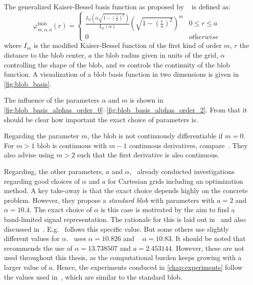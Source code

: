 \begin{definition}\label{def:blob_basis_fn}
	The generalized Kaiser-Bessel basis function as proposed by
	\citeauthor{lewitt_multidimensional_1990}~\cite{lewitt_multidimensional_1990,
		lewitt_alternatives_1992} is defined as:
	\[
		\varphi^{\text{blob}}_{m, \alpha, a}(r) =
		\begin{cases}
			\frac{I_m\left( \alpha \sqrt{1 - \left(\frac{r}{a}\right)^2} \right)} {I_m\left( \alpha \right)} \left( \sqrt{1 - \left(\frac{r}{a}\right)^2}\right)^m & 0 \le r \le a      \\
			0                                                                                                                                                      & \textit{otherwise}
		\end{cases}
	\]
	where \(I_m\) is the modified Kaiser-Bessel function of the first kind of order \(m\), \(r\) the
	distance to the blob center, \(a\) the blob radius given in units of the grid, \(\alpha\)
	controlling the shape of the blob, and \(m\) controls the continuity of the blob function. A
	visualization of a blob basis function in two dimensions is given in \autoref{fig:blob_basis}.
\end{definition}

The influence of the parameters \(\alpha\) and \(m\) is shown in
\autoref{fig:blob_basis_alphas_order_0}--\autoref{fig:blob_basis_alphas_order_2}. From that it
should be clear how important the exact choice of parameters is.

Regarding the parameter \(m\), the blob is not continuously differentiable if \(m = 0\). For \(m >
1\) blob is continuous with \(m - 1\) continuous derivatives, compare~\cite{matej_practical_1996}.
They also advise using \(m > 2\) such that the first derivative is also continuous.

Regarding, the other parameters, \(a\) and \(\alpha\),~\cite{matej_practical_1996} already conducted
investigations regarding good choices of \(\alpha\) and \(a\) for Cartesian grids including an
optimization method. A key take-away is that the exact choice depends highly on the concrete
problem. However, they propose a \textit{standard blob} with parameters with \(a = 2\) and \(\alpha
= 10.4\). The exact choice of \(\alpha\) is this case is motivated by the aim to find a band-limited
signal representation. The rationale for this is laid out in~\cite{lewitt_multidimensional_1990}
and also discussed in~\cite{benkarroum_blob_2015}. E.g.~\cite{xu_investigation_2012} follows this
specific value. But some others use slightly different values for
\(\alpha\).~\cite{kohler_iterative_2011} uses \(\alpha = 10.826\) and
~\cite{levakhina_three-dimensional_2014} \(\alpha = 10.83\). It should be noted
that~\cite{benkarroum_blob_2015} recommends the use of \(\alpha = 13.738507\) and \(a = 2.453144\).
However, these are not used throughout this thesis, as the computational burden keeps growing with a
larger value of \(a\). Hence, the experiments conduced in \autoref{chap:experiments} follow the
values used in~\cite{levakhina_three-dimensional_2014}, which are similar to the standard blob.

